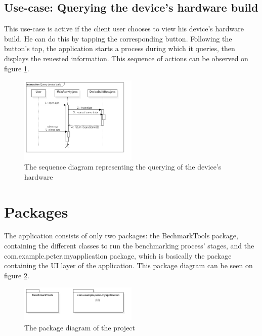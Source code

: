 \documentclass[a4paper,10pt]{report}
\begin{document}
 \pagebreak
 \subsection{Use-case: Querying the device's hardware build}
 This use-case is active if the client user chooses to view his device's hardware build. He can do this by tapping the corresponding button. Following the button's tap, the application starts a process during which it queries, then displays the reuested information. This sequence of actions can be observed on figure \ref{fig:querySeqDiag1}.
 
 \begin{figure}[h]
  \centering
  \includegraphics[width=0.5\textwidth]{SequenceDiagram_DeviceBuild.png}
  \caption{The sequence diagram representing the querying of the device's hardware}
  \label{fig:querySeqDiag1}
 \end{figure}
 
 \pagebreak
 \section{Packages}
 The application consists of only two packages: the BechmarkTools package, containing the different classes to run the benchmarking process' stages, and the com.example.peter.myapplication package, which is basically the package containing the UI layer of the application. This package diagram can be seen on figure \ref{fig:packageDiag1}.
 
 \begin{figure}[h]
  \centering
  \includegraphics[width=0.5\textwidth]{PackageDiagram1.png}
  \caption{The package diagram of the project}
  \label{fig:packageDiag1}
  
 \end{figure}
\end{document}
